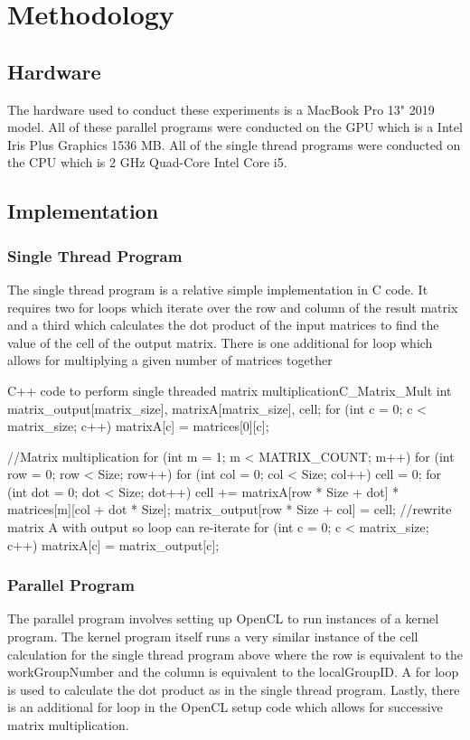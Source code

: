 \section{Methodology}

\subsection{Hardware}
The hardware used to conduct these experiments is a MacBook Pro 13" 2019 model.
All of these parallel programs were conducted on the GPU which is a Intel Iris Plus Graphics 1536 MB.
All of the single thread programs were conducted on the CPU which is 2 GHz Quad-Core Intel Core i5.

\subsection{Implementation}

\subsubsection{Single Thread Program}
The single thread program is a relative simple implementation in C code.
It requires two for loops which iterate over the row and column of the result matrix and a third which calculates the dot product of the input matrices to find the value of the cell of the output matrix.
There is one additional for loop which allows for multiplying a given number of matrices together

\begin{OpenCL}{C++ code to perform single threaded matrix multiplication}{C_Matrix_Mult}
    int matrix_output[matrix_size], matrixA[matrix_size], cell;
    for (int c = 0; c < matrix_size; c++) matrixA[c] = matrices[0][c];

    //Matrix multiplication
    for (int m = 1; m < MATRIX_COUNT; m++) {
    for (int row = 0; row < Size; row++) {
    for (int col = 0; col < Size; col++) {
    cell = 0;
    for (int dot = 0; dot < Size; dot++) {
            cell += matrixA[row * Size + dot] * matrices[m][col + dot * Size];
        }
    matrix_output[row * Size + col] = cell;
    }
    }
    //rewrite matrix A with output so loop can re-iterate
    for (int c = 0; c < matrix_size; c++) matrixA[c] = matrix_output[c];
    }
\end{OpenCL}

\subsubsection{Parallel Program}
The parallel program involves setting up OpenCL to run instances of a kernel program.
The kernel program itself runs a very similar instance of the cell calculation for the single thread program above where the row is equivalent to the workGroupNumber and the column is equivalent to the localGroupID.
A for loop is used to calculate the dot product as in the single thread program.
Lastly, there is an additional for loop in the OpenCL setup code which allows for successive matrix multiplication.


